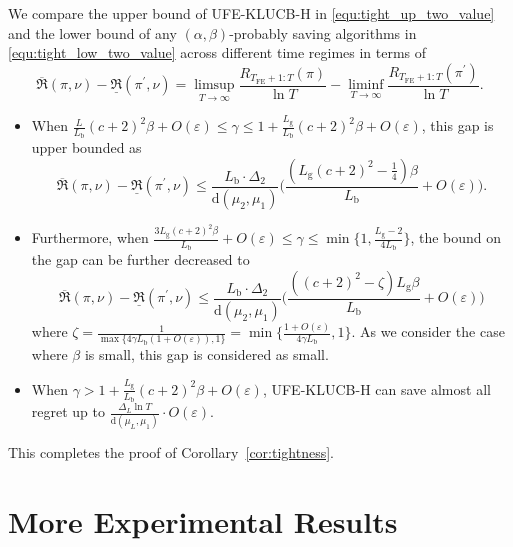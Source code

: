 \documentclass[twoside,11pt]{article}
\newcommand{\rmb}{\mathrm{b}}
\newcommand{\rmd}{\mathrm{d}}
\newcommand{\rmg}{\mathrm{g}}
\newcommand{\Tfe}{T_{\mathrm{FE}}}
\newcommand{\ouralg}{\textsc{UFE-KLUCB-H}}
\begin{document}
 We compare the upper bound of \ouralg{} in \eqref{equ:tight_up_two_value} and the lower bound of any $ (\alpha,\beta)$-probably saving algorithms in \eqref{equ:tight_low_two_value} across different time regimes in terms of
 $$\overline{\mathfrak{R}}(\pi,\nu)-\underline{\mathfrak{R}}(\pi^\prime,\nu)= \limsup_{T\to\infty}  \frac{R_{\Tfe+1:T} (\pi )}{\ln T} -  \liminf_{T\to\infty}  \frac{R_{\Tfe+1:T} (\pi^\prime )}{\ln T}.$$
\begin{itemize}
    \item When $ \frac{L}{L_{\rmb}} (c+2)^2\beta  + O(\varepsilon) \leq \gamma \leq 1 +  \frac{L_{\rmg}}{L_{\rmb}} (c+2)^2\beta + O(\varepsilon)$,
        this gap is upper bounded as
        $$\overline{\mathfrak{R}}(\pi,\nu)-\underline{\mathfrak{R}}(\pi^\prime,\nu)\le \frac{L_{\rmb}\cdot \Delta_{2}}{\rmd(\mu_2,\mu_1)}\bigg(\frac{(L_{\rmg}(c+2)^2-\frac{1}{4})\beta}{L_{\rmb}}+O(\varepsilon)\bigg).$$     
    \item Furthermore, when $\frac{3L_{\rmg}(c+2)^2\beta}{L_{\rmb}} + O(\varepsilon)\leq \gamma\leq \min\big\{1,\frac{L_{\rmg}-2}{4L_{\rmb}}\big\}$,
    the bound on the gap can be further decreased to
     $$\overline{\mathfrak{R}}(\pi,\nu)-\underline{\mathfrak{R}}(\pi^\prime,\nu)\le \frac{L_{\rmb}\cdot \Delta_{2}}{\rmd(\mu_2,\mu_1)}\bigg(\frac{((c+2)^2-\zeta)L_{\rmg}\beta}{L_{\rmb}}+O(\varepsilon)\bigg)$$  
     where $\zeta = \frac{1}{\max\{4\gamma L_{\rmb}(1+O(\varepsilon)),1\}}= \min\{ \frac{1+O(\varepsilon)}{4\gamma L_{\rmb}},1\}$.
     As we consider the case where $\beta$ is small, this gap is considered as small.
    \item When $\gamma>1 +  \frac{L_{\rmg}}{L_{\rmb}} (c+2)^2\beta + O(\varepsilon)$, \ouralg{} can save almost all regret up to $\frac{\Delta_{L}\ln T}{\rmd(\mu_L,\mu_1)}\cdot O(\varepsilon)$.
\end{itemize}
This completes the proof of Corollary~\ref{cor:tightness}.

\section{More Experimental Results}\label{app:exp}
\end{document}
